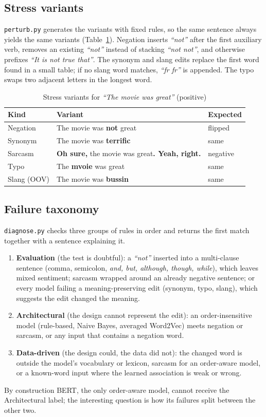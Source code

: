 \documentclass[conference]{IEEEtran}
\newcommand{\ex}[1]{\textit{``#1''}}
\begin{document}
\subsection{Stress variants}
\texttt{perturb.py} generates the variants with fixed rules, so the same sentence always yields the
same variants (Table~\ref{tab:variants}). Negation inserts \ex{not} after the first auxiliary verb,
removes an existing \ex{not} instead of stacking \ex{not not}, and otherwise prefixes \ex{It is not
true that}. The synonym and slang edits replace the first word found in a small table; if no slang
word matches, \ex{fr fr} is appended. The typo swaps two adjacent letters in the longest word.

\begin{table}[t]
\centering
\caption{Stress variants for \ex{The movie was great} (positive)}
\label{tab:variants}
\footnotesize
\begin{tabular}{@{}lp{4.1cm}l@{}}
\toprule
\textbf{Kind} & \textbf{Variant} & \textbf{Expected} \\
\midrule
Negation & The movie was \textbf{not} great & flipped \\
Synonym & The movie was \textbf{terrific} & same \\
Sarcasm & \textbf{Oh sure,} the movie was great\textbf{. Yeah, right.} & negative \\
Typo & The \textbf{mvoie} was great & same \\
Slang (OOV) & The movie was \textbf{bussin} & same \\
\bottomrule
\end{tabular}
\end{table}

\subsection{Failure taxonomy}
\texttt{diagnose.py} checks three groups of rules in order and returns the first match together
with a sentence explaining it.
\begin{enumerate}
  \item \textbf{Evaluation} (the test is doubtful): a \ex{not} inserted into a multi-clause sentence
        (comma, semicolon, \emph{and, but, although, though, while}), which leaves mixed sentiment;
        sarcasm wrapped around an already negative sentence; or every model failing a
        meaning-preserving edit (synonym, typo, slang), which suggests the edit changed the meaning.
  \item \textbf{Architectural} (the design cannot represent the edit): an order-insensitive model
        (rule-based, Naive Bayes, averaged Word2Vec) meets negation or sarcasm, or any input that
        contains a negation word.
  \item \textbf{Data-driven} (the design could, the data did not): the changed word is outside the
        model's vocabulary or lexicon, sarcasm for an order-aware model, or a known-word input where
        the learned association is weak or wrong.
\end{enumerate}
By construction BERT, the only order-aware model, cannot receive the Architectural label; the
interesting question is how its failures split between the other two.
\end{document}
